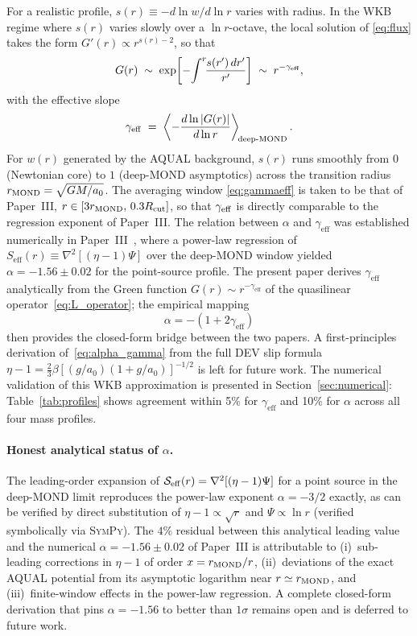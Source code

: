 \documentclass[aps,prd,twocolumn,superscriptaddress,nofootinbib]{revtex4-2}
\begin{document}
For a realistic profile, $s(r) \equiv -d\ln w/d\ln r$ varies with
radius. In the WKB regime where $s(r)$ varies slowly over a
$\ln r$-octave, the local solution of \eqref{eq:flux} takes the form
$G'(r)\propto r^{s(r)-2}$, so that
\begin{equation}
G(r) \;\sim\; \exp\!\left[-\!\int^r\!\!\frac{s(r')\,dr'}{r'}\right]
\;\sim\; r^{-\gamma_{\rm eff}},
\label{eq:WKB}
\end{equation}
with the effective slope
\begin{equation}
\gamma_{\rm eff} \;=\; \left\langle -\frac{d\ln|G(r)|}{d\ln r}
\right\rangle_{\!\rm deep\text{-}MOND}.
\label{eq:gammaeff}
\end{equation}
For $w(r)$ generated by the AQUAL background, $s(r)$ runs smoothly
from $0$ (Newtonian core) to $1$ (deep-MOND asymptotics) across the
transition radius $r_{\rm MOND}=\sqrt{GM/a_0}$. The averaging
window \eqref{eq:gammaeff} is taken to be that of Paper~III,
$r\in[3 r_{\rm MOND},\,0.3 R_{\rm cut}]$, so that $\gamma_{\rm eff}$
is directly comparable to the regression exponent of Paper~III.
The relation between $\alpha$ and $\gamma_\mathrm{eff}$ was
established numerically in Paper~III~\cite{DEV_paperIII}, where a
power-law regression of
$S_\mathrm{eff}(r) \equiv \nabla^2[(\eta-1)\Psi]$ over the
deep-MOND window yielded $\alpha = -1.56\pm0.02$ for the
point-source profile. The present paper derives
$\gamma_\mathrm{eff}$ analytically from the Green function
$G(r)\sim r^{-\gamma_\mathrm{eff}}$ of the quasilinear
operator~\eqref{eq:L_operator}; the empirical mapping
\begin{equation}
  \alpha = -(1 + 2\gamma_\mathrm{eff})
  \label{eq:alpha_gamma}
\end{equation}
then provides the closed-form bridge between the two papers.
A first-principles derivation of~\eqref{eq:alpha_gamma} from the
full DEV slip formula
$\eta - 1 = \tfrac{2}{3}\beta[(g/a_0)(1+g/a_0)]^{-1/2}$ is left
for future work.
The numerical validation of this WKB approximation is presented
in Section~\ref{sec:numerical}: Table~\ref{tab:profiles} shows
agreement within 5\% for $\gamma_\mathrm{eff}$ and 10\% for
$\alpha$ across all four mass profiles.

\paragraph*{Honest analytical status of $\alpha$.}
The leading-order expansion of
$\mathcal{S}_{\rm eff}(r) = \nabla^2[(\eta-1)\Psi]$ for a point
source in the deep-MOND limit reproduces the power-law exponent
$\alpha = -3/2$ exactly, as can be verified by direct
substitution of $\eta - 1 \propto \sqrt{r}$ and
$\Psi \propto \ln r$ (verified symbolically via \textsc{SymPy}).
The $4\%$ residual between this analytical leading value and the
numerical $\alpha = -1.56 \pm 0.02$ of Paper~III
\cite{DEV_paperIII} is attributable to
(i)~sub-leading corrections in $\eta - 1$ of order
$x = r_{\rm MOND}/r$,
(ii)~deviations of the exact AQUAL potential from its
asymptotic logarithm near $r \simeq r_{\rm MOND}$, and
(iii)~finite-window effects in the power-law regression. A
complete closed-form derivation that pins
$\alpha = -1.56$ to better than $1\sigma$ remains open and is
deferred to future work.
\end{document}
